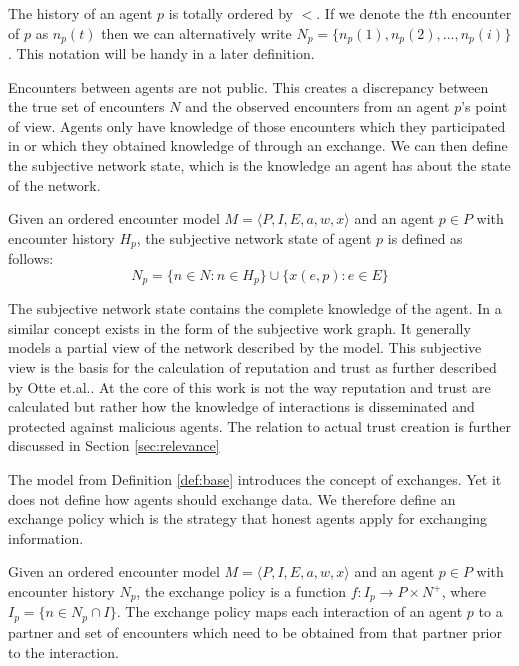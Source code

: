 The history of an agent $p$ is totally ordered by $<$. If we denote the 
$t$th encounter of $p$ as $n_p(t)$ then we can alternatively write $N_p = \{ n_p(1), n_p(2), ..., n_p(i)\}$.
This notation will be handy in a later definition.

Encounters between agents are not public. This creates a discrepancy between the true set of 
encounters $N$ and the observed encounters from an agent $p$'s point of view. Agents only have 
knowledge of those encounters which they participated in or which they obtained knowledge of through an exchange.
We can then define the subjective network state, which is the knowledge an agent has about the state of
the network.

\begin{defn}
    \label{def:subjective_network_state}
    Given an ordered encounter model $M = \langle P, I, E, a, w, x \rangle$ and an agent $p \in P$ with encounter history $H_p$, the subjective network state of agent $p$
    is defined as follows:
    \begin{equation}
        N_p = \{ n \in N : n \in H_p \} \cup \{ x(e, p) : e \in E \}
    \end{equation}
\end{defn}

The subjective network state contains the complete knowledge of the agent. In \cite{OTTE2017} a 
similar concept exists in the form of the subjective work graph. It generally models a partial view
of the network described by the model. This subjective view is the basis for the calculation of 
reputation and trust as further described by Otte et.al.. At the core of this work is not the way 
reputation and trust are calculated but rather how the knowledge of interactions is disseminated and
protected against malicious agents. The relation to actual trust creation is further discussed in 
Section \ref{sec:relevance}

The model from Definition \ref{def:base} introduces the concept of exchanges. Yet it does not define
how agents should exchange data. We therefore define an exchange policy which is the strategy that 
honest agents apply for exchanging information.

\begin{defn}
    Given an ordered encounter model $M = \langle P, I, E, a, w, x \rangle$ and an agent $p \in P$ with encounter history $N_p$,
    the exchange policy is a function $f : I_p \rightarrow P \times N^+$, where $I_p = \{ n \in N_p  \cap I\}$.
    The exchange policy maps each interaction of an agent $p$ to a partner and set of encounters 
    which need to be obtained from that partner prior to the interaction.
\end{defn}

